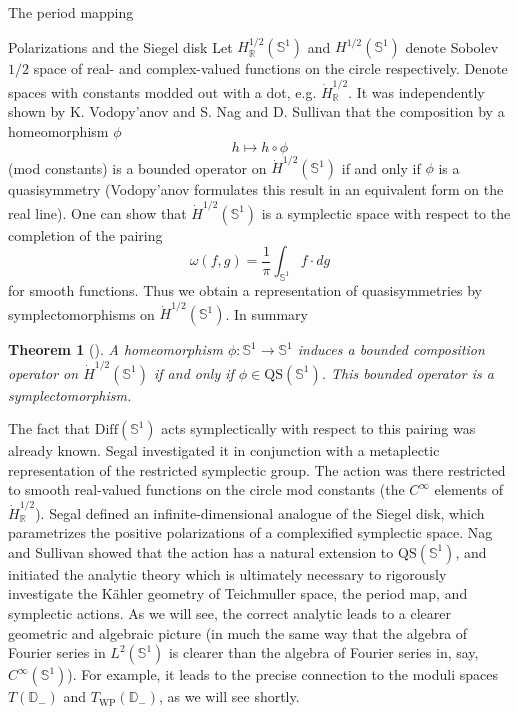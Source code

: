 \documentclass[12pt]{amsart}
\newcommand{\disk}{\ensuremath{\mathbb{D}} } %
\theoremstyle{plain}
\newtheorem{theorem}{Theorem}[section]
\theoremstyle{definition}
\theoremstyle{remark}
\numberwithin{equation}{section} %
\numberwithin{figure}{section} %
\begin{document}
\begin{section}{The period mapping}
\begin{subsection}{Polarizations and the Siegel disk}
 Let $H^{1/2}_{\mathbb{R}}(\mathbb{S}^1)$ and $H^{1/2}(\mathbb{S}^1)$ denote Sobolev $1/2$ space of real- and complex-valued functions on the circle respectively. Denote spaces with constants modded out with a dot, e.g. $\dot{H}^{1/2}_{\mathbb{R}}$. 
 It was independently shown by K. Vodopy'anov \cite{Vodopyanov} and S. Nag and D. Sullivan \cite{NagSullivan} that the composition by a homeomorphism $\phi$
 \[  h \mapsto  h \circ \phi  \]
 (mod constants) is a bounded operator on $\dot{H}^{1/2}(\mathbb{S}^1)$ if and only if $\phi$ is a quasisymmetry 
 (Vodopy'anov formulates this result in an equivalent form on the real line).
 One can show that $\dot{H}^{1/2}(\mathbb{S}^1)$
 is a symplectic space with respect to the completion of the pairing
  \begin{equation} \label{eq:symplectic_form_Honehalf}
     \omega(f,g) = \frac{1}{\pi} \int_{\mathbb{S}^1} f \cdot dg  
  \end{equation}
 for smooth functions. 
 Thus we obtain a representation of quasisymmetries by symplectomorphisms on $\dot{H}^{1/2}(\mathbb{S}^1)$. In summary
 \begin{theorem}[\cite{Vodopyanov,NagSullivan}] \label{th:symp_are_quasi}
  A homeomorphism $\phi:\mathbb{S}^1 \rightarrow \mathbb{S}^1$ induces a bounded composition operator on $\dot{H}^{1/2}(\mathbb{S}^1)$ if and only if $\phi \in \mathrm{QS}(\mathbb{S}^1)$. This bounded operator is a symplectomorphism.
 \end{theorem}

 The fact that $\mathrm{Diff}(\mathbb{S}^1)$ acts symplectically with respect to this pairing was already known. Segal \cite{SegalUnitary} investigated it in conjunction with a metaplectic representation of the restricted symplectic group. The action was there restricted to smooth real-valued functions on the circle mod constants (the $C^\infty$ elements of $\dot{H}^{1/2}_{\mathbb{R}}$).
  Segal defined an infinite-dimensional analogue of the Siegel disk, which parametrizes the positive polarizations of a complexified symplectic space.
  Nag and Sullivan \cite{NagSullivan} showed that the action has a natural extension to $\mathrm{QS}(\mathbb{S}^1)$, and initiated the analytic theory which is ultimately necessary to rigorously investigate the K\"ahler geometry of Teichmuller space, the period map, {and symplectic actions}. As we will see, the correct analytic leads to a clearer geometric and algebraic picture (in much the same way that the algebra of Fourier series in $L^2(\mathbb{S}^1)$ is clearer than the algebra of Fourier series in, say, $C^\infty(\mathbb{S}^1)$).  For example, it leads to the precise connection to the moduli spaces $T(\disk_-)$ and $T_{\mathrm{WP}}(\disk_-)$, as we will see shortly.\\
  

\end{subsection}
\end{section}
\end{document}
